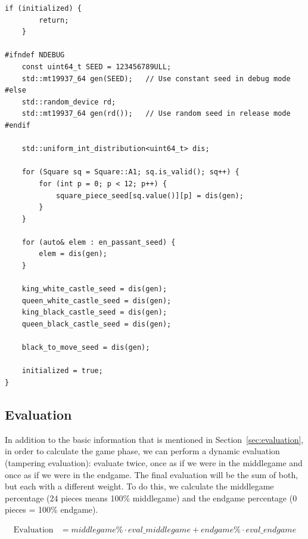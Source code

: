 \begin{itemize}
\begin{lstlisting}[breaklines=true, frame=single, caption={Initialization of seeds}]
    if (initialized) {
        return;
    }

#ifndef NDEBUG
    const uint64_t SEED = 123456789ULL;
    std::mt19937_64 gen(SEED);   // Use constant seed in debug mode
#else
    std::random_device rd;
    std::mt19937_64 gen(rd());   // Use random seed in release mode
#endif

    std::uniform_int_distribution<uint64_t> dis;

    for (Square sq = Square::A1; sq.is_valid(); sq++) {
        for (int p = 0; p < 12; p++) {
            square_piece_seed[sq.value()][p] = dis(gen);
        }
    }

    for (auto& elem : en_passant_seed) {
        elem = dis(gen);
    }

    king_white_castle_seed = dis(gen);
    queen_white_castle_seed = dis(gen);
    king_black_castle_seed = dis(gen);
    queen_black_castle_seed = dis(gen);

    black_to_move_seed = dis(gen);

    initialized = true;
}
\end{lstlisting}

\end{itemize}

\subsection{Evaluation}

In addition to the basic information that is mentioned in Section~\ref{sec:evaluation}, in order to calculate the game phase, we can perform a dynamic evaluation (tampering evaluation): evaluate twice, once as if we were in the middlegame and once as if we were in the endgame. The final evaluation will be the sum of both, but each with a different weight. To do this, we calculate the middlegame percentage (24 pieces means 100\% middlegame) and the endgame percentage (0 pieces = 100\% endgame).

\begin{align*}
\text{Evaluation} &= middlegame\% \cdot eval\_middlegame + endgame\% \cdot eval\_endgame
\end{align*}

\vspace{1em}


